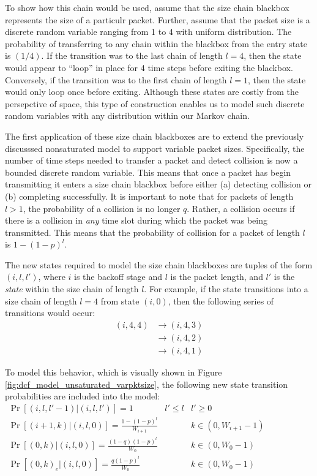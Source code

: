 \documentclass[conference]{IEEEtran}
\begin{document}
To show how this chain would be used, assume that the size chain blackbox represents the size of a particulr packet. Further, assume that the packet size is a discrete random variable ranging from 1 to 4 with uniform distribution. The probability of transferring to any chain within the blackbox from the entry state is $(1/4)$. If the transition was to the last chain of length $l = 4$, then the state would appear to ``loop'' in place for 4 time steps before exiting the blackbox. Conversely, if the transition was to the first chain of length $l = 1$, then the state would only loop once before exiting. Although these states are costly from the persepctive of space, this type of construction enables us to model such discrete random variables with any distribution within our Markov chain. 

The first application of these size chain blackboxes are to extend the previously discusssed nonsaturated model to support variable packet sizes. Specifically, the number of time steps needed to transfer a packet and detect collision is now a bounded discrete random variable. This means that once a packet has begin transmitting it enters a size chain blackbox before either (a) detecting collision or (b) completing successfully. It is important to note that for packets of length $l > 1$, the probability of a collision is no longer $q$. Rather, a collision occurs if there is a collision in \emph{any} time slot during which the packet was being transmitted. This means that the probability of collision for a packet of length $l$ is $1 - (1 - p)^l$. 

The new states required to model the size chain blackboxes are tuples of the form $(i, l, l')$, where $i$ is the backoff stage and $l$ is the packet length, and $l'$ is the \emph{state} within the size chain of length $l$. For example, if the state transitions into a size chain of length $l = 4$ from state $(i, 0)$, then the following series of transitions would occur: 
\begin{align*}
(i, 4, 4) & \to (i, 4, 3) \\
& \to (i, 4, 2) \\
& \to (i, 4, 1)
\end{align*}

To model this behavior, which is visually shown in Figure \ref{fig:dcf_model_unsaturated_varpktsize}, the following new state transition probabilities are included into the model:
\begin{math}
\boxed{
\begin{array}{lll}
\Pr[(i,l,l'-1) | (i,l,l')] = 1 & l' \leq l & l' \geq 0 \\
\Pr[(i+1,k) | (i,l,0)] = \frac{1 - (1 - p)^l}{W_{i+1}} & ~ & k \in (0, W_{i+1} - 1) \\
\Pr[(0,k) | (i,l,0)] = \frac{(1 - q)(1 - p)^l}{W_0} & ~ & k \in (0, W_{0} - 1) \\
\Pr[(0,k)_e | (i,l,0)] = \frac{q(1 - p)^l}{W_0} & ~ & k \in (0, W_{0} - 1) \\
\end{array}
}
\end{math}
\end{document}
